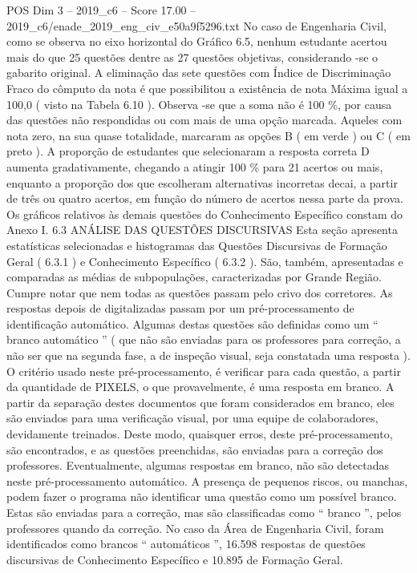 \begin{textsample}{POS Dim 3 – 2019\_c6 – Score 17.00 – 2019\_c6/enade\_2019\_eng\_civ\_e50a9f5296.txt}
No caso de Engenharia Civil, como se observa no eixo horizontal do Gráfico 6.5, nenhum estudante acertou mais do que 25 questões dentre as 27 questões objetivas, considerando -se o gabarito original.
A eliminação das sete questões com Índice de Discriminação Fraco do cômputo da nota é que possibilitou a existência de nota Máxima igual a 100,0 ( visto na Tabela 6.10 ).
Observa -se que a soma não é 100 \%, por causa das questões não respondidas ou com mais de uma opção marcada.
Aqueles com nota zero, na sua quase totalidade, marcaram as opções B ( em verde ) ou C ( em preto ).
A proporção de estudantes que selecionaram a resposta correta D aumenta gradativamente, chegando a atingir 100 \% para 21 acertos ou mais, enquanto a proporção dos que escolheram alternativas incorretas decai, a partir de três ou quatro acertos, em função do número de acertos nessa parte da prova.
Os gráficos relativos às demais questões do Conhecimento Específico constam do Anexo I. 6.3 ANÁLISE DAS QUESTÕES DISCURSIVAS Esta seção apresenta estatísticas selecionadas e histogramas das Questões Discursivas de Formação Geral ( 6.3.1 ) e Conhecimento Específico ( 6.3.2 ).
São, também, apresentadas e comparadas as médias de subpopulações, caracterizadas por Grande Região.
Cumpre notar que nem todas as questões passam pelo crivo dos corretores.
As respostas depois de digitalizadas passam por um pré-processamento de identificação automático.
Algumas destas questões são definidas como um “ branco automático ” ( que não são enviadas para os professores para correção, a não ser que na segunda fase, a de inspeção visual, seja constatada uma resposta ).
O critério usado neste pré-processamento, é verificar para cada questão, a partir da quantidade de PIXELS, o que provavelmente, é uma resposta em branco.
A partir da separação destes documentos que foram considerados em branco, eles são enviados para uma verificação visual, por uma equipe de colaboradores, devidamente treinados.
Deste modo, quaisquer erros, deste pré-processamento, são encontrados, e as questões preenchidas, são enviadas para a correção dos professores.
Eventualmente, algumas respostas em branco, não são detectadas neste pré-processamento automático.
A presença de pequenos riscos, ou manchas, podem fazer o programa não identificar uma questão como um possível branco.
Estas são enviadas para a correção, mas são classificadas como “ branco ”, pelos professores quando da correção.
No caso da Área de Engenharia Civil, foram identificados como brancos “ automáticos ”, 16.598 respostas de questões discursivas de Conhecimento Específico e 10.895 de Formação Geral.

\end{textsample}

